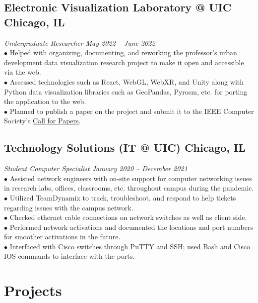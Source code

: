 \documentclass{article}
\begin{document}
\subsection{Electronic Visualization Laboratory @ UIC \hfill \textnormal{Chicago, IL}}
\vspace{-0.5em}
\textit{Undergraduate Researcher \hfill May 2022 -- June 2022}
\\
$\bullet$ Helped with organizing, documenting, and reworking the professor's urban development data visualization research project to make it open and accessible via the web.
\\
$\bullet$ Assessed technologies such as React, WebGL, WebXR, and Unity along with Python data visualization libraries such as GeoPandas, Pyrosm, etc. for porting the application to the web.
\\
$\bullet$ Planned to publish a paper on the project and submit it to the IEEE Computer Society's \href{https://www.computer.org/digital-library/magazines/cg/cfp-metaverse-virtual-worlds}{\underline{Call for Papers}}.


\subsection{Technology Solutions (IT @ UIC) \hfill \textnormal{Chicago, IL}}
\vspace{-0.5em}
\textit{Student Computer Specialist \hfill January 2020 -- December 2021}
\\
$\bullet$ Assisted network engineers with on-site support for computer networking issues in research labs, offices, classrooms, etc. throughout campus during the pandemic.
\\
$\bullet$ Utilized TeamDynamix to track, troubleshoot, and respond to help tickets regarding issues with the campus network.
\\
$\bullet$ Checked ethernet cable connections on network switches as well as client side.
\\
$\bullet$ Performed network activations and documented the locations and port numbers for smoother activations in the future.
\\
$\bullet$ Interfaced with Cisco switches through PuTTY and SSH; used Bash and Cisco IOS commands to interface with the ports.


\section{Projects}
\end{document}
